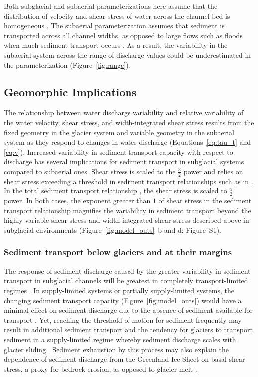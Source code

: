\documentclass[11pt]{article}
\begin{document}
\begin{spacing}{1}
  Both subglacial and subaerial parameterizations here assume that the distribution of velocity and shear stress of water across the channel bed is homogeneous \citep[Section~\ref{sect:sub_mode}~and~\ref{sect:fluv}][]{yager2018}. 
  The subaerial parameterization assumes that sediment is transported across all channel widths, as opposed to large flows such as floods when much sediment transport occurs \citep{wolman1960}.
  As a result, the variability in the subaerial system across the range of discharge values could be underestimated in the parameterization (Figure~\ref{fig:range}).
  
  \subsection{Geomorphic Implications}
  \label{sect:GI}
  The relationship between water discharge variability and relative variability of the water velocity, shear stress, and width-integrated shear stress results from the fixed geometry in the glacier system and variable geometry in the subaerial system as they respond to changes in water discharge (Equations~\ref{eq:tau_t} and \ref{eq:v}).
  Increased variability in sediment transport capacity with respect to discharge has several implications for sediment transport in subglacial systems compared to subaerial ones.
  Shear stress is scaled to the $\frac{3}{2}$ power and relies on shear stress exceeding a threshold in sediment transport relationships  such as in \citet{meyer1948}.
  In the total sediment transport relationship \citet{engelund1967}, the shear stress is scaled to $\frac{5}{2}$ power.
  In both cases, the exponent greater than $1$ of shear stress in the sediment transport relationship magnifies the variability in sediment transport beyond the highly variable shear stress and width-integrated shear stress described above in subglacial environments (Figure~\ref{fig:model_outs}\, b and d; Figure~S1).

  
  \subsubsection{Sediment transport below glaciers and at their margins}
  
  The response of sediment discharge caused by the greater variability in sediment transport in subglacial channels will be greatest in completely transport-limited regimes \citep[e.g.][]{kasmalkar2019}.
  In supply-limited systems or partially supply-limited systems, the changing sediment transport capacity (Figure~\ref{fig:model_outs}) would have a minimal effect on sediment discharge due to the absence of sediment available for transport \citep{delaney2019}.
  Yet, reaching the threshold of motion for sediment frequently  may result in additional sediment transport and the tendency for glaciers to transport sediment in a supply-limited regime whereby sediment discharge scales with glacier sliding  \citep[e.g.][]{herman2015,koppes2015}.
  Sediment exhaustion by this process may also explain the dependence of sediment discharge from the Greenland Ice Sheet on basal shear stress, a proxy for bedrock erosion, as opposed to glacier melt \citep{overeem2017}.


\end{spacing}
\end{document}
